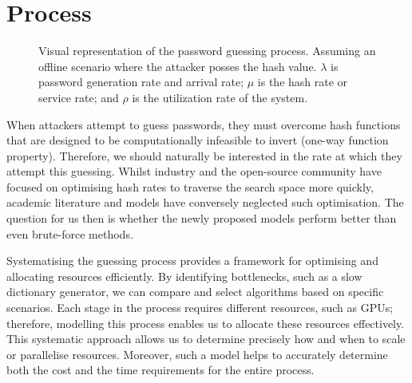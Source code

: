 \section{Process}
\label{sec::chp5::process}

\begin{figure}[t]
\centering
{}
\caption{Visual representation of the password guessing process. Assuming an offline scenario where the attacker posses the hash value. $\lambda$ is password generation rate and arrival rate; $\mu$ is the hash rate or service rate; and $\rho$ is the utilization rate of the system.}
\label{fig:password-guessing-model}
\end{figure}

When attackers attempt to guess passwords, they must overcome hash functions that are designed to be computationally infeasible to invert (one-way function property). Therefore, we should naturally be interested in the rate at which they attempt this guessing. Whilst industry and the open-source community have focused on optimising hash rates to traverse the search space more quickly, academic literature and models have conversely neglected such optimisation. The question for us then is whether the newly proposed models perform better than even brute-force methods.

Systematising the guessing process provides a framework for optimising and allocating resources efficiently. By identifying bottlenecks, such as a slow dictionary generator, we can compare and select algorithms based on specific scenarios. Each stage in the process requires different resources, such as GPUs; therefore, modelling this process enables us to allocate these resources effectively. This systematic approach allows us to determine precisely how and when to scale or parallelise resources. Moreover, such a model helps to accurately determine both the cost and the time requirements for the entire process.

